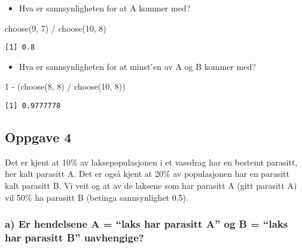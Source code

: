 \documentclass[
  12pt,
  a4paper,
  DIV=11,
  numbers=noendperiod]{scrartcl}
\newenvironment{Shaded}{\begin{snugshade}}{\end{snugshade}}
\newcommand{\DecValTok}[1]{\textcolor[rgb]{0.68,0.00,0.00}{#1}}
\newcommand{\FunctionTok}[1]{\textcolor[rgb]{0.28,0.35,0.67}{#1}}
\newcommand{\NormalTok}[1]{\textcolor[rgb]{0.00,0.23,0.31}{#1}}
\newcommand{\SpecialCharTok}[1]{\textcolor[rgb]{0.37,0.37,0.37}{#1}}
\providecommand{\tightlist}{%
  \setlength{\itemsep}{0pt}\setlength{\parskip}{0pt}}\usepackage{longtable,booktabs,array}
\begin{document}
\begin{itemize}
\tightlist
\item
  Hva er sannsynligheten for at A kommer med?
\end{itemize}

\begin{Shaded}
\begin{Highlighting}[]
\FunctionTok{choose}\NormalTok{(}\DecValTok{9}\NormalTok{, }\DecValTok{7}\NormalTok{) }\SpecialCharTok{/} \FunctionTok{choose}\NormalTok{(}\DecValTok{10}\NormalTok{, }\DecValTok{8}\NormalTok{)}
\end{Highlighting}
\end{Shaded}

\begin{verbatim}
[1] 0.8
\end{verbatim}

\begin{itemize}
\tightlist
\item
  Hva er sannsynligheten for at minst ́en av A og B kommer med?
\end{itemize}

\begin{Shaded}
\begin{Highlighting}[]
\DecValTok{1} \SpecialCharTok{{-}}\NormalTok{ (}\FunctionTok{choose}\NormalTok{(}\DecValTok{8}\NormalTok{, }\DecValTok{8}\NormalTok{) }\SpecialCharTok{/} \FunctionTok{choose}\NormalTok{(}\DecValTok{10}\NormalTok{, }\DecValTok{8}\NormalTok{))}
\end{Highlighting}
\end{Shaded}

\begin{verbatim}
[1] 0.9777778
\end{verbatim}

\subsection{Oppgave 4}\label{oppgave-4}

Det er kjent at 10\% av laksepopulasjonen i et vassdrag har en bestemt
parasitt, her kalt parasitt A. Det er også kjent at 20\% av populasjonen
har en parasitt kalt parasitt B. Vi veit og at av de laksene som har
parasitt A (gitt parasitt A) vil 50\% ha parasitt B (betinga
sannsynlighet 0.5).

\subsubsection{a) Er hendelsene A = ``laks har parasitt A'' og B =
``laks har parasitt B''
uavhengige?}\label{a-er-hendelsene-a-laks-har-parasitt-a-og-b-laks-har-parasitt-b-uavhengige}
\end{document}
